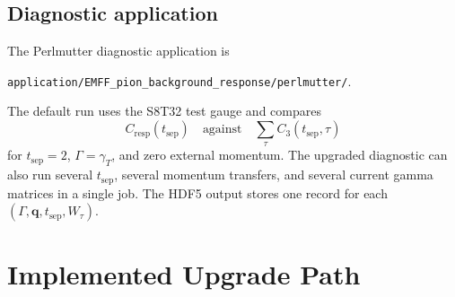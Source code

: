 \documentclass[11pt,a4paper]{article}
\newcommand{\Cthree}{C_3}
\newcommand{\Cresp}{C_{\mathrm{resp}}}
\begin{document}
\subsection{Diagnostic application}

The Perlmutter diagnostic application is
\begin{center}
\texttt{application/EMFF\_pion\_background\_response/perlmutter/}.
\end{center}
The default run uses the S8T32 test gauge and compares
\begin{equation}
  \Cresp(t_{\mathrm{sep}})
  \quad\text{against}\quad
  \sum_\tau \Cthree(t_{\mathrm{sep}},\tau)
\end{equation}
for \(t_{\mathrm{sep}}=2\), \(\Gamma=\gamma_T\), and zero external momentum.
The upgraded diagnostic can also run several \(t_{\mathrm{sep}}\), several
momentum transfers, and several current gamma matrices in a single job.  The
HDF5 output stores one record for each
\((\Gamma,\mathbf q,t_{\mathrm{sep}},W_\tau)\).

\section{Implemented Upgrade Path}
\end{document}

